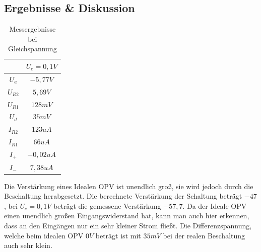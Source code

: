 \documentclass[12pt,a4paper,titlepage]{article}
\begin{document}
\subsection*{Ergebnisse \& Diskussion}


\begin{table}[H]
  \centering
  \begin{tabular}{c|c}
    & $U_e = 0,1V$ \\
    \hline
    $U_a$ & $-5,77V$ \\
    \hline
    $U_{R2}$ & $5,69V$ \\
    \hline
    $U_{R1}$ & $128mV$ \\
    \hline
    $U_d$ & $35mV$ \\
    \hline
    $I_{R2}$ & $123uA$ \\
    \hline
    $I_{R1}$ & $66uA$ \\
    \hline
    $I_{+}$ & $-0,02uA$ \\
    \hline
    $I_{-}$ & $7,38uA$ \\
  \end{tabular}
  \caption{Messergebnisse bei Gleichspannung}
\end{table}

\noindent Die Verstärkung eines Idealen OPV ist unendlich groß, sie wird jedoch durch die Beschaltung herabgesetzt. Die berechnete Verstärkung der Schaltung beträgt $-47$, bei $U_e = 0,1V$ beträgt die gemessene Verstärkung $-57,7$. Da der Ideale OPV einen unendlich großen Eingangswiderstand hat, kann man auch hier erkennen, dass an den Eingängen nur ein sehr kleiner Strom fließt. Die Differenzspannung, welche beim idealen OPV $0V$ beträgt ist mit $35mV$ bei der realen Beschaltung auch sehr klein.
\end{document}
